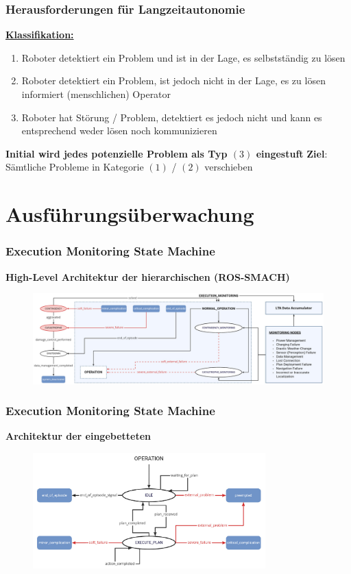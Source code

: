 \documentclass{beamer}
\begin{document}
\begin{frame}
  \frametitle{Herausforderungen für Langzeitautonomie}
  \textbf{\underline{Klassifikation:}}
  \begin{enumerate}
    \item Roboter detektiert ein Problem und ist in der Lage, es selbstständig zu lösen
    \item Roboter detektiert ein Problem, ist jedoch nicht in der Lage, es zu lösen \textrightarrow \thinspace informiert (menschlichen) Operator
    \item Roboter hat Störung / Problem, detektiert es jedoch nicht und kann es entsprechend weder lösen noch kommunizieren
  \end{enumerate}
  \textrightarrow \thinspace \textbf{Initial wird jedes potenzielle Problem als Typ $(3)$ eingestuft}\newline
  \textbf{Ziel}: Sämtliche Probleme in Kategorie $(1)$ / $(2)$ verschieben
\end{frame}

\section{Ausführungsüberwachung}

\begin{frame}
  \frametitle{Execution Monitoring State Machine}
  \textbf{High-Level Architektur der hierarchischen  (ROS-SMACH)}
  \begin{figure}[H]
    \centering
    \includegraphics[width=\textwidth]{img/SMACH_high_level.png}
  \end{figure}
\end{frame}

\begin{frame}
  \frametitle{Execution Monitoring State Machine}
  \textbf{Architektur der eingebetteten }
  \begin{figure}[H]
    \centering
    \includegraphics[width=0.8\textwidth]{img/SMACH_low_level.png}
  \end{figure}
\end{frame}
\end{document}
